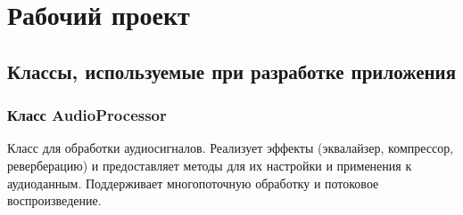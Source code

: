 \section{Рабочий проект}

\subsection{Классы, используемые при разработке приложения}

\subsubsection{Класс AudioProcessor}

Класс для обработки аудиосигналов. Реализует эффекты (эквалайзер, компрессор, реверберацию) и предоставляет методы для их настройки и применения к аудиоданным. Поддерживает многопоточную обработку и потоковое воспроизведение.
 

